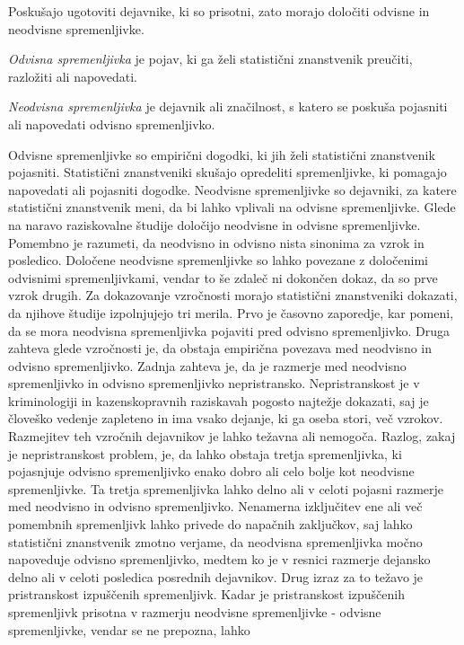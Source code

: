 \documentclass[mat1, tisk]{fmfdelo}
\theoremstyle{definition} %
\theoremstyle{trditev} %
\theoremstyle{izrek}
\begin{document}
Poskušajo ugotoviti dejavnike, ki so prisotni, zato morajo določiti odvisne in neodvisne spremenljivke.
\begin{definicija}
    \textit{Odvisna spremenljivka} je pojav, ki ga želi statistični znanstvenik preučiti, razložiti ali napovedati.
\end{definicija}
\begin{definicija}
    \textit{Neodvisna spremenljivka} je dejavnik ali značilnost, s katero se poskuša pojasniti ali napovedati odvisno spremenljivko.
\end{definicija}
Odvisne spremenljivke so empirični dogodki, ki jih želi statistični znanstvenik pojasniti. Statistični znanstveniki skušajo opredeliti spremenljivke, ki pomagajo
napovedati ali pojasniti dogodke. Neodvisne spremenljivke so dejavniki, za katere statistični znanstvenik meni, da bi lahko vplivali na odvisne
spremenljivke. Glede na naravo raziskovalne študije določijo neodvisne in odvisne spremenljivke.\\
Pomembno je razumeti, da neodvisno in odvisno nista sinonima za vzrok in posledico. Določene neodvisne spremenljivke so lahko povezane z
določenimi odvisnimi spremenljivkami, vendar to še zdaleč ni dokončen dokaz, da so prve vzrok drugih. Za dokazovanje vzročnosti morajo
statistični znanstveniki dokazati, da njihove študije izpolnjujejo tri merila. Prvo je časovno zaporedje, kar pomeni, da se mora neodvisna spremenljivka
pojaviti pred odvisno spremenljivko. Druga zahteva glede vzročnosti je, da obstaja empirična povezava med neodvisno in odvisno spremenljivko.
Zadnja zahteva je, da je razmerje med neodvisno spremenljivko in odvisno spremenljivko nepristransko. Nepristranskost je v kriminologiji in
kazenskopravnih raziskavah pogosto najtežje dokazati, saj je človeško vedenje zapleteno in ima vsako dejanje, ki ga oseba stori, več vzrokov.
Razmejitev teh vzročnih dejavnikov je lahko težavna ali nemogoča. Razlog, zakaj je nepristranskost problem, je, da lahko obstaja tretja
spremenljivka, ki pojasnjuje odvisno spremenljivko enako dobro ali celo bolje kot neodvisne spremenljivke. Ta tretja spremenljivka lahko delno
ali v celoti pojasni razmerje med neodvisno in odvisno spremenljivko. Nenamerna izključitev ene ali več pomembnih spremenljivk lahko privede do
napačnih zaključkov, saj lahko statistični znanstvenik zmotno verjame, da neodvisna spremenljivka močno napoveduje odvisno spremenljivko, medtem ko je v
resnici razmerje dejansko delno ali v celoti posledica posrednih dejavnikov. Drug izraz za to težavo je pristranskost izpuščenih spremenljivk.
Kadar je pristranskost izpuščenih spremenljivk prisotna v razmerju neodvisne spremenljivke - odvisne spremenljivke, vendar se ne prepozna, lahko
\end{document}
